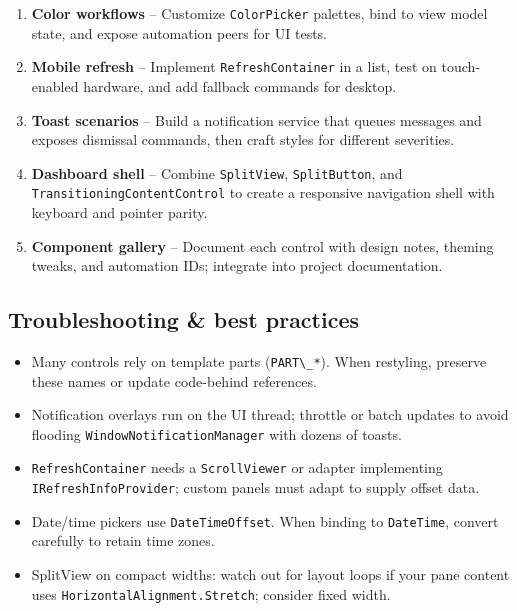 \begin{enumerate}
\def\labelenumi{\arabic{enumi}.}
\tightlist
\item
  \textbf{Color workflows} -- Customize
  \passthrough{\lstinline!ColorPicker!} palettes, bind to view model
  state, and expose automation peers for UI tests.
\item
  \textbf{Mobile refresh} -- Implement
  \passthrough{\lstinline!RefreshContainer!} in a list, test on
  touch-enabled hardware, and add fallback commands for desktop.
\item
  \textbf{Toast scenarios} -- Build a notification service that queues
  messages and exposes dismissal commands, then craft styles for
  different severities.
\item
  \textbf{Dashboard shell} -- Combine
  \passthrough{\lstinline!SplitView!},
  \passthrough{\lstinline!SplitButton!}, and
  \passthrough{\lstinline!TransitioningContentControl!} to create a
  responsive navigation shell with keyboard and pointer parity.
\item
  \textbf{Component gallery} -- Document each control with design notes,
  theming tweaks, and automation IDs; integrate into project
  documentation.
\end{enumerate}

\subsection{Troubleshooting \& best
practices}\label{troubleshooting-best-practices-5}

\begin{itemize}
\tightlist
\item
  Many controls rely on template parts
  (\passthrough{\lstinline!PART\_*!}). When restyling, preserve these
  names or update code-behind references.
\item
  Notification overlays run on the UI thread; throttle or batch updates
  to avoid flooding \passthrough{\lstinline!WindowNotificationManager!}
  with dozens of toasts.
\item
  \passthrough{\lstinline!RefreshContainer!} needs a
  \passthrough{\lstinline!ScrollViewer!} or adapter implementing
  \passthrough{\lstinline!IRefreshInfoProvider!}; custom panels must
  adapt to supply offset data.
\item
  Date/time pickers use \passthrough{\lstinline!DateTimeOffset!}. When
  binding to \passthrough{\lstinline!DateTime!}, convert carefully to
  retain time zones.
\item
  SplitView on compact widths: watch out for layout loops if your pane
  content uses \passthrough{\lstinline!HorizontalAlignment.Stretch!};
  consider fixed width.
\end{itemize}

